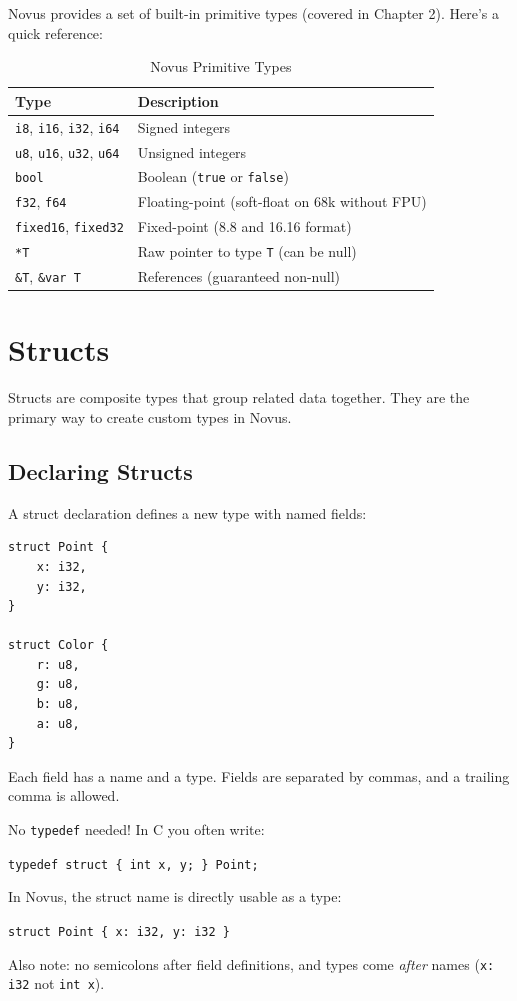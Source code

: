 Novus provides a set of built-in primitive types (covered in Chapter 2). Here's a quick reference:

\begin{table}[h]
\centering
\begin{tabular}{ll}
\hline
\textbf{Type} & \textbf{Description} \\
\hline
\texttt{i8}, \texttt{i16}, \texttt{i32}, \texttt{i64} & Signed integers \\
\texttt{u8}, \texttt{u16}, \texttt{u32}, \texttt{u64} & Unsigned integers \\
\texttt{bool} & Boolean (\texttt{true} or \texttt{false}) \\
\texttt{f32}, \texttt{f64} & Floating-point (soft-float on 68k without FPU) \\
\texttt{fixed16}, \texttt{fixed32} & Fixed-point (8.8 and 16.16 format) \\
\texttt{*T} & Raw pointer to type \texttt{T} (can be null) \\
\texttt{\&T}, \texttt{\&var T} & References (guaranteed non-null) \\
\hline
\end{tabular}
\caption{Novus Primitive Types}
\end{table}

\section{Structs}

Structs are composite types that group related data together. They are the primary way to create custom types in Novus.

\subsection{Declaring Structs}

A struct declaration defines a new type with named fields:

\begin{lstlisting}
struct Point {
    x: i32,
    y: i32,
}

struct Color {
    r: u8,
    g: u8,
    b: u8,
    a: u8,
}
\end{lstlisting}

Each field has a name and a type. Fields are separated by commas, and a trailing comma is allowed.

\begin{comingfromc}
No \texttt{typedef} needed! In C you often write:

\texttt{typedef struct \{ int x, y; \} Point;}

In Novus, the struct name is directly usable as a type:

\texttt{struct Point \{ x: i32, y: i32 \}}

Also note: no semicolons after field definitions, and types come \textit{after} names (\texttt{x: i32} not \texttt{int x}).
\end{comingfromc}

